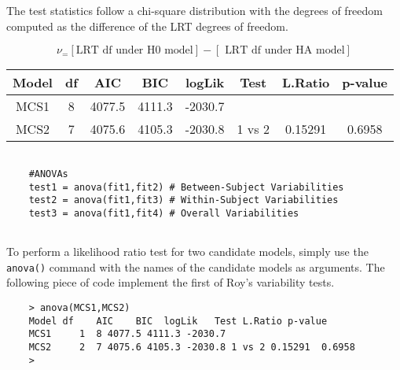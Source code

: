 \documentclass[12pt, a4paper]{article}
\theoremstyle{plain}
\theoremstyle{definition}
\theoremstyle{remark}
\begin{document}
%



The test statistics follow a 
chi-square distribution with the degrees of freedom
computed as the difference of the LRT degrees of freedom.

\begin{equation}
\nu_ = [ \mbox{LRT df under H0 model}] - [\mbox{ LRT df under HA model}]
\end{equation}

%
%
%
\begin{center}
	\begin{tabular}{|c|c|c|c|c|c|c|c|}
		\hline
		Model   &      df &   AIC  & BIC      & logLik & Test & L.Ratio & p-value \\ \hline
		MCS1    &       8 & 4077.5 & 4111.3 & -2030.7  &       &         &        \\ \hline
		MCS2    &       7 & 4075.6 & 4105.3 & -2030.8  & 1 vs 2 & 0.15291 & 0.6958 \\
		\hline 
	\end{tabular} 
\end{center}
\begin{framed}
	\begin{verbatim}
	
	#ANOVAs
	test1 = anova(fit1,fit2) # Between-Subject Variabilities
	test2 = anova(fit1,fit3) # Within-Subject Variabilities
	test3 = anova(fit1,fit4) # Overall Variabilities
	
	\end{verbatim}
\end{framed}

To perform a likelihood ratio test for two candidate models, simply use the \texttt{anova()} command with the names of the candidate models as arguments. The following piece of code implement the first of Roy's variability tests.

\begin{framed}
	\begin{verbatim}
	> anova(MCS1,MCS2)
	Model df    AIC    BIC  logLik   Test L.Ratio p-value
	MCS1     1  8 4077.5 4111.3 -2030.7
	MCS2     2  7 4075.6 4105.3 -2030.8 1 vs 2 0.15291  0.6958
	>
	\end{verbatim}
\end{framed}
\end{document}
